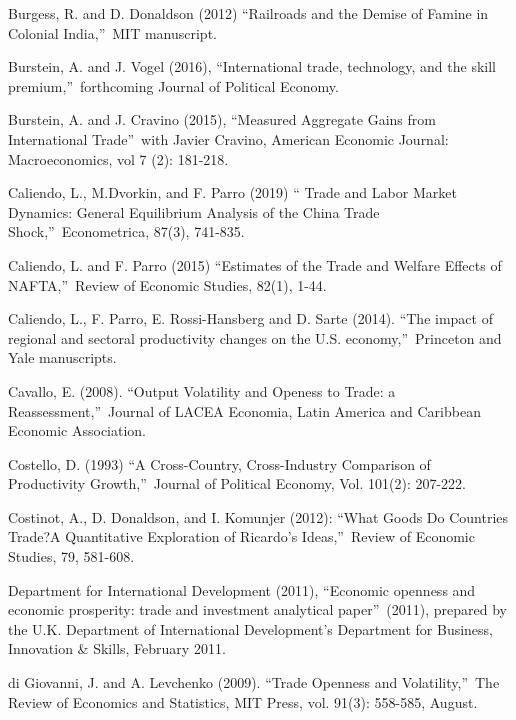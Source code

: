 \documentclass[12pt]{article}
\begin{document}
\begin{thebibliography}{99}
\bibitem{} Burgess, R. and D. Donaldson (2012) \textquotedblleft Railroads
and the Demise of Famine in Colonial India,\textquotedblright\ MIT
manuscript.

\bibitem{} Burstein, A. and J. Vogel (2016), \textquotedblleft International
trade, technology, and the skill premium,\textquotedblright\ forthcoming
Journal of Political Economy.

\bibitem{} Burstein, A. and J. Cravino (2015), \textquotedblleft Measured
Aggregate Gains from International Trade\textquotedblright\ with Javier
Cravino, American Economic Journal: Macroeconomics, vol 7 (2): 181-218.

\bibitem{} Caliendo, L., M.Dvorkin, and F. Parro (2019) \textquotedblleft
Trade and Labor Market Dynamics: General Equilibrium Analysis of the China
Trade Shock,\textquotedblright\ Econometrica, 87(3), 741-835.

\bibitem{} Caliendo, L. and F. Parro (2015) \textquotedblleft Estimates of
the Trade and Welfare Effects of NAFTA,\textquotedblright\ Review of
Economic Studies, 82(1), 1-44.

\bibitem{} Caliendo, L., F. Parro, E. Rossi-Hansberg and D. Sarte (2014).
\textquotedblleft The impact of regional and sectoral productivity changes
on the U.S. economy,\textquotedblright\ Princeton and Yale manuscripts.

\bibitem{} Cavallo, E. (2008). \textquotedblleft Output Volatility and
Openess to Trade: a Reassessment,\textquotedblright\ Journal of LACEA
Economia, Latin America and Caribbean Economic Association.

\bibitem{} Costello, D. (1993) \textquotedblleft A Cross-Country,
Cross-Industry Comparison of Productivity Growth,\textquotedblright\ Journal
of Political Economy, Vol. 101(2): 207-222.

\bibitem{} Costinot, A., D. Donaldson, and I. Komunjer (2012):
\textquotedblleft What Goods Do Countries Trade?A Quantitative Exploration
of Ricardo's Ideas,\textquotedblright\ Review of Economic Studies, 79,
581-608.

\bibitem{} Department for International Development (2011),
\textquotedblleft Economic openness and economic prosperity: trade and
investment analytical paper\textquotedblright\ (2011), prepared by the U.K.
Department of International Development's Department for Business,
Innovation \& Skills, February 2011.

\bibitem{} di Giovanni, J. and A. Levchenko (2009). \textquotedblleft Trade
Openness and Volatility,\textquotedblright\ The Review of Economics and
Statistics, MIT Press, vol. 91(3): 558-585, August.


\end{thebibliography}
\end{document}
